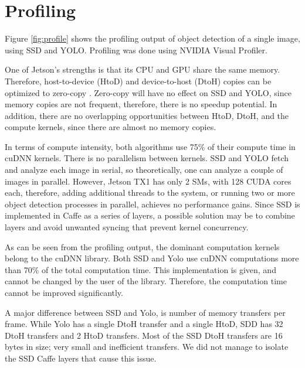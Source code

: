 \section{Profiling}
\label{sec:profiling}

Figure \ref{fig:profile} shows the profiling output of object detection of a single image, using SSD and YOLO. Profiling was done using NVIDIA Visual Profiler.

One of Jetson's strengths is that its CPU and GPU share the same memory. Therefore, host-to-device (HtoD) and device-to-host (DtoH) copies can be optimized to zero-copy \cite{tegrazerocopy}. Zero-copy will have no effect on SSD and YOLO, since memory copies are not frequent, therefore, there is no speedup potential. In addition, there are no overlapping opportunities between HtoD, DtoH, and the compute kernels, since there are almost no memory copies.

In terms of compute intensity, both algorithms use 75\% of their compute time in cuDNN kernels. There is no parallelism between kernels. SSD and YOLO fetch and analyze each image in serial, so theoretically, one can analyze a couple of images in parallel. However, Jetson TX1 has only 2 SMs, with 128 CUDA cores each, therefore, adding additional threads to the system, or running two or more object detection processes in parallel, achieves no performance gains. Since SSD is implemented in Caffe as a series of layers, a possible solution may be to combine layers and avoid unwanted syncing that prevent kernel concurrency.

As can be seen from the profiling output, the dominant computation kernels belong to the cuDNN library. Both SSD and Yolo use cuDNN computations more than 70\% of the total computation time. This implementation is given, and cannot be changed by the user of the library. Therefore, the computation time cannot be improved significantly.

A major difference between SSD and Yolo, is number of memory transfers per frame. While Yolo has a single DtoH transfer and a single HtoD, SDD has 32 DtoH transfers and 2 HtoD transfers. Most of the SSD DtoH transfers are 16 bytes in size; very small and inefficient transfers. We did not manage to isolate the SSD Caffe layers that cause this issue.  


